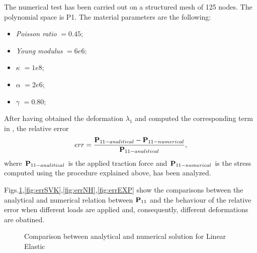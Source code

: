 The numerical test has been carried out on a structured mesh of 125 nodes. The polynomial space is P1. The material parameters are the following:
\begin{itemize}
  \item \textit{Poisson ratio} $= 0.45$;
  \item \textit{Young modulus} $= 6e6$;
  \item $\kappa$ $=1e8$; 
  \item $\alpha$ $=2e6$; 
  \item $\gamma$ $=0.80$; 
\end{itemize}
After having obtained the deformation $\lambda_1$ and computed the corresponding term in \Piola, the relative error
\begin{equation}
  err = \displaystyle \frac{\textbf{P}_{11-analitical}-\textbf{P}_{11-numerical}}{\textbf{P}_{11-analitical}},
\end{equation}
where $\textbf{P}_{11-analitical}$ is the applied traction force and $\textbf{P}_{11-numerical}$ is the stress computed using the procedure explained above, has been analyzed.

Figs.\ref{fig:errLE},\ref{fig:errSVK},\ref{fig:errNH},\ref{fig:errEXP} show the comparisons between the analytical and numerical relation between $\textbf{P}_{11}$ and the behaviour of the relative error when different loads are applied and, consequently, different deformations are obatined.

\begin{figure}[h!]
\centering
{}
\caption{Comparison between analytical and numerical solution for Linear Elastic}
\label{fig:errLE}
\end{figure}

